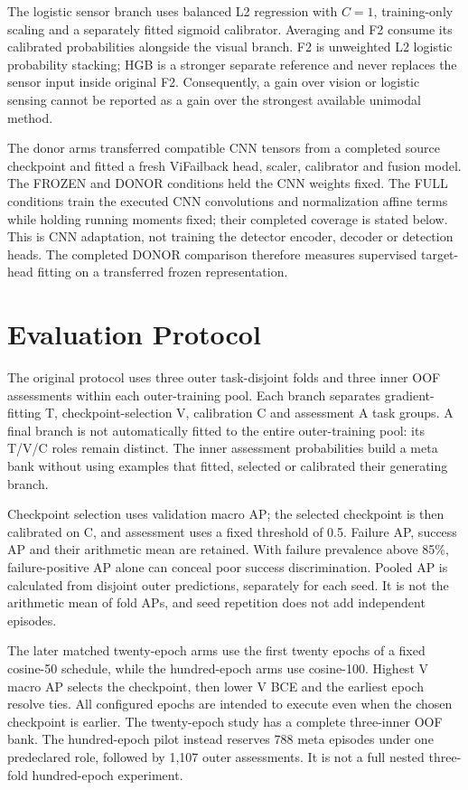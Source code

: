 The logistic sensor branch uses balanced L2 regression with $C=1$, training-only scaling and a separately fitted sigmoid calibrator. Averaging and F2 consume its calibrated probabilities alongside the visual branch. F2 is unweighted L2 logistic probability stacking; HGB is a stronger separate reference and never replaces the sensor input inside original F2. Consequently, a gain over vision or logistic sensing cannot be reported as a gain over the strongest available unimodal method.

The donor arms transferred compatible CNN tensors from a completed source checkpoint and fitted a fresh ViFailback head, scaler, calibrator and fusion model. The FROZEN and DONOR conditions held the CNN weights fixed. The FULL conditions train the executed CNN convolutions and normalization affine terms while holding running moments fixed; their completed coverage is stated below. This is CNN adaptation, not training the detector encoder, decoder or detection heads. The completed DONOR comparison therefore measures supervised target-head fitting on a transferred frozen representation.

\section{Evaluation Protocol}
The original protocol uses three outer task-disjoint folds and three inner OOF assessments within each outer-training pool. Each branch separates gradient-fitting T, checkpoint-selection V, calibration C and assessment A task groups. A final branch is not automatically fitted to the entire outer-training pool: its T/V/C roles remain distinct. The inner assessment probabilities build a meta bank without using examples that fitted, selected or calibrated their generating branch.

Checkpoint selection uses validation macro AP; the selected checkpoint is then calibrated on C, and assessment uses a fixed threshold of 0.5. Failure AP, success AP and their arithmetic mean are retained. With failure prevalence above 85\%, failure-positive AP alone can conceal poor success discrimination. Pooled AP is calculated from disjoint outer predictions, separately for each seed. It is not the arithmetic mean of fold APs, and seed repetition does not add independent episodes.

The later matched twenty-epoch arms use the first twenty epochs of a fixed cosine-50 schedule, while the hundred-epoch arms use cosine-100. Highest V macro AP selects the checkpoint, then lower V BCE and the earliest epoch resolve ties. All configured epochs are intended to execute even when the chosen checkpoint is earlier. The twenty-epoch study has a complete three-inner OOF bank. The hundred-epoch pilot instead reserves 788 meta episodes under one predeclared role, followed by 1,107 outer assessments. It is not a full nested three-fold hundred-epoch experiment.

